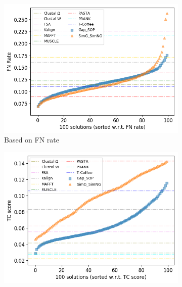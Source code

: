 
\begin{figure}[!htbp]
	
	\begin{adjustwidth}{-1.5cm}{-1.5cm}
		\centering
		\begin{subfigure}{0.75\columnwidth}
			\includegraphics[width=\columnwidth]{Figure/summary/precomputedInit/avg_fnrate_density}
			\caption{Based on FN rate}
		\end{subfigure}	
		\begin{subfigure}{0.75\columnwidth}
			\includegraphics[width=\columnwidth]{Figure/summary/precomputedInit/avg_tc_density}

\end{subfigure}
\end{adjustwidth}
\end{figure}
